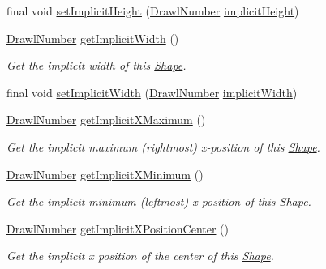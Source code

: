 \begin{DoxyCompactItemize}
final void \hyperlink{classcom_1_1aarrelaakso_1_1drawl_1_1_shape_acb96a96a1d43132def75a38c136c563f}{set\+Implicit\+Height} (\hyperlink{classcom_1_1aarrelaakso_1_1drawl_1_1_drawl_number}{Drawl\+Number} \hyperlink{classcom_1_1aarrelaakso_1_1drawl_1_1_shape_af2f5b1d81ce2cdabc8b18dfb029f413b}{implicit\+Height})
\item 
\hyperlink{classcom_1_1aarrelaakso_1_1drawl_1_1_drawl_number}{Drawl\+Number} \hyperlink{classcom_1_1aarrelaakso_1_1drawl_1_1_shape_af7ebce58a8dbba0cbe372040b74d7fca}{get\+Implicit\+Width} ()
\begin{DoxyCompactList}\small\item\em Get the implicit width of this \hyperlink{classcom_1_1aarrelaakso_1_1drawl_1_1_shape}{Shape}. \end{DoxyCompactList}\item 
final void \hyperlink{classcom_1_1aarrelaakso_1_1drawl_1_1_shape_a03a408248a797d817ab32d5b833d5e1d}{set\+Implicit\+Width} (\hyperlink{classcom_1_1aarrelaakso_1_1drawl_1_1_drawl_number}{Drawl\+Number} \hyperlink{classcom_1_1aarrelaakso_1_1drawl_1_1_shape_a00c6b870d70449a79a000a3374ae041c}{implicit\+Width})
\item 
\hyperlink{classcom_1_1aarrelaakso_1_1drawl_1_1_drawl_number}{Drawl\+Number} \hyperlink{classcom_1_1aarrelaakso_1_1drawl_1_1_shape_ae1820c7d674c6c022b72cc086005131f}{get\+Implicit\+X\+Maximum} ()
\begin{DoxyCompactList}\small\item\em Get the implicit maximum (rightmost) x-\/position of this \hyperlink{classcom_1_1aarrelaakso_1_1drawl_1_1_shape}{Shape}. \end{DoxyCompactList}\item 
\hyperlink{classcom_1_1aarrelaakso_1_1drawl_1_1_drawl_number}{Drawl\+Number} \hyperlink{classcom_1_1aarrelaakso_1_1drawl_1_1_shape_a43b7aaf82c47e231b57622b0346d3ce1}{get\+Implicit\+X\+Minimum} ()
\begin{DoxyCompactList}\small\item\em Get the implicit minimum (leftmost) x-\/position of this \hyperlink{classcom_1_1aarrelaakso_1_1drawl_1_1_shape}{Shape}. \end{DoxyCompactList}\item 
\hyperlink{classcom_1_1aarrelaakso_1_1drawl_1_1_drawl_number}{Drawl\+Number} \hyperlink{classcom_1_1aarrelaakso_1_1drawl_1_1_shape_ac7a69f5cb9dd954f5054a3bebc35af41}{get\+Implicit\+X\+Position\+Center} ()
\begin{DoxyCompactList}\small\item\em Get the implicit x position of the center of this \hyperlink{classcom_1_1aarrelaakso_1_1drawl_1_1_shape}{Shape}. \end{DoxyCompactList}\item 

\end{DoxyCompactItemize}
